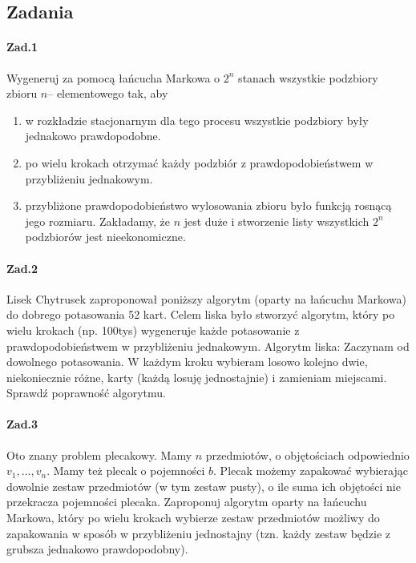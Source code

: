 \subsection{Zadania}
\paragraph{Zad.1} Wygeneruj za pomocą łańcucha Markowa o $2^n$ stanach wszystkie podzbiory zbioru $n$– elementowego tak, aby
\begin{enumerate}[label=\alph*)]
\item w rozkładzie stacjonarnym dla tego procesu wszystkie podzbiory były jednakowo prawdopodobne.
\item po wielu krokach otrzymać każdy podzbiór z prawdopodobieństwem w przybliżeniu jednakowym.
\item przybliżone prawdopodobieństwo wylosowania zbioru było funkcją rosnącą jego rozmiaru.
Zakładamy, że $n$ jest duże i stworzenie listy wszystkich $2^n$ podzbiorów jest nieekonomiczne.
\end{enumerate}

\paragraph{Zad.2} Lisek Chytrusek zaproponował poniższy algorytm (oparty na łańcuchu Markowa) do dobrego potasowania 52 kart. Celem liska było stworzyć algorytm, który po wielu krokach (np. 100tys) wygeneruje każde potasowanie z prawdopodobieństwem w przybliżeniu jednakowym. Algorytm liska: Zaczynam od dowolnego potasowania. W każdym kroku wybieram losowo kolejno dwie, niekoniecznie różne, karty (każdą losuję jednostajnie) i zamieniam miejscami. Sprawdź poprawność algorytmu.

\paragraph{Zad.3} Oto znany problem plecakowy. Mamy $n$ przedmiotów, o objętościach odpowiednio $v_1, . . . , v_n$. Mamy też plecak o pojemności $b$. Plecak możemy zapakować wybierając dowolnie zestaw przedmiotów (w tym zestaw pusty), o ile suma ich objętości nie przekracza pojemności plecaka. Zaproponuj algorytm oparty na łańcuchu Markowa, który po wielu krokach wybierze zestaw przedmiotów możliwy do zapakowania w sposób w przybliżeniu jednostajny (tzn. każdy zestaw będzie z grubsza jednakowo prawdopodobny).

